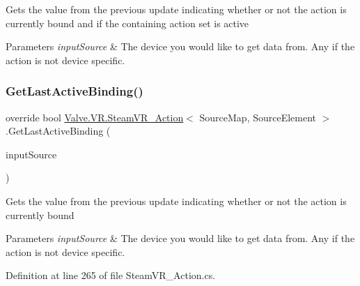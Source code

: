 Gets the value from the previous update indicating whether or not the action is currently bound and if the containing action set is active 


\begin{DoxyParams}{Parameters}
{\em input\+Source} & The device you would like to get data from. Any if the action is not device specific.\\
\hline
\end{DoxyParams}
\mbox{\label{class_valve_1_1_v_r_1_1_steam_v_r___action_a9f6a753a369e7932e99aebd540bdf886}} 
\subsubsection{\texorpdfstring{GetLastActiveBinding()}{GetLastActiveBinding()}\hspace{0.1cm}{\footnotesize\ttfamily [1/2]}}
{\footnotesize\ttfamily override bool \mbox{\hyperlink{class_valve_1_1_v_r_1_1_steam_v_r___action}{Valve.\+V\+R.\+Steam\+V\+R\+\_\+\+Action}}$<$ Source\+Map, Source\+Element $>$.Get\+Last\+Active\+Binding (\begin{DoxyParamCaption}\item[{\mbox{\hyperlink{namespace_valve_1_1_v_r_a82e5bf501cc3aa155444ee3f0662853f}{Steam\+V\+R\+\_\+\+Input\+\_\+\+Sources}}}]{input\+Source }\end{DoxyParamCaption})}



Gets the value from the previous update indicating whether or not the action is currently bound 


\begin{DoxyParams}{Parameters}
{\em input\+Source} & The device you would like to get data from. Any if the action is not device specific.\\
\hline
\end{DoxyParams}


Definition at line 265 of file Steam\+V\+R\+\_\+\+Action.\+cs.

\mbox{\label{class_valve_1_1_v_r_1_1_steam_v_r___action_ab3f5864e5b4baaf02de9ab7eb77ba4d0}} 
